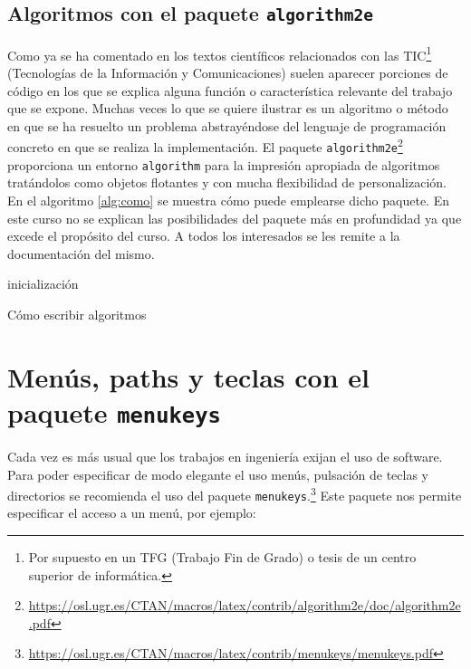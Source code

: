 \subsection{Algoritmos con el paquete \texttt{algorithm2e}}
Como ya se ha comentado en los textos científicos relacionados con las 
TIC\footnote{Por supuesto en un TFG (Trabajo Fin de Grado) o tesis 
de un centro superior de informática.} (Tecnologías de la Información y 
Comunicaciones) suelen aparecer porciones de código en los que se explica 
alguna función o característica relevante del trabajo que se expone. Muchas 
veces lo que se quiere ilustrar es un algoritmo o método en que se ha 
resuelto un problema abstrayéndose del lenguaje de programación concreto en 
que se realiza la implementación. El paquete 
\texttt{algorithm2e}\footnote{\url{https://osl.ugr.es/CTAN/macros/latex/contrib/algorithm2e/doc/algorithm2e.pdf}}
 proporciona un entorno \texttt{algorithm} para la impresión apropiada de 
algoritmos tratándolos como objetos flotantes y con mucha flexibilidad de 
personalización. En el algoritmo \ref{alg:como} se muestra cómo puede 
emplearse dicho paquete. En este curso no se explican las posibilidades del 
paquete más en profundidad ya que excede el propósito del curso. A todos los 
interesados se les remite a la documentación del mismo.


\IncMargin{1em}
\begin{algorithm}
\LinesNumbered
\SetAlgoLined


inicialización\;

\caption{Cómo escribir algoritmos}\label{alg:como}
\end{algorithm}\DecMargin{1em}


\section{Menús, paths y teclas con el paquete \texttt{menukeys}}
Cada vez es más usual que los trabajos en ingeniería exijan el uso de 
software. Para poder especificar de modo elegante el uso menús, pulsación de 
teclas y directorios se recomienda el uso del paquete 
\texttt{menukeys}.\footnote{\url{https://osl.ugr.es/CTAN/macros/latex/contrib/menukeys/menukeys.pdf}}
  Este paquete nos permite especificar el acceso a un menú, por 
ejemplo:

